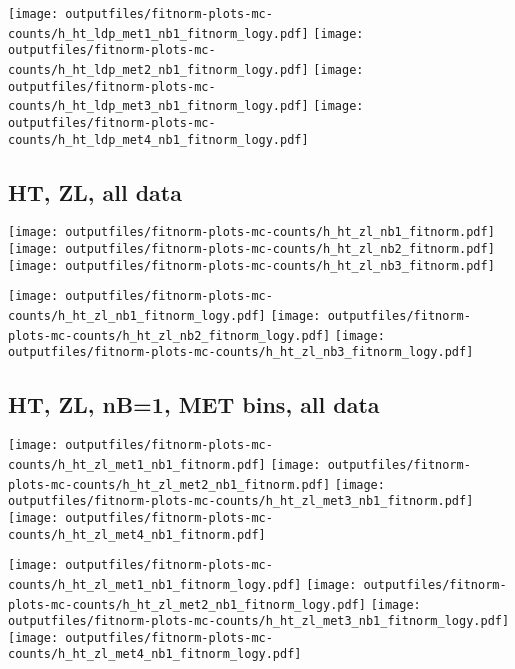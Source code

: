\documentclass[11pt]{article}
\begin{document}
    \noindent
     \texttt{[image: outputfiles/fitnorm-plots-mc-counts/h\_ht\_ldp\_met1\_nb1\_fitnorm\_logy.pdf]}
     \texttt{[image: outputfiles/fitnorm-plots-mc-counts/h\_ht\_ldp\_met2\_nb1\_fitnorm\_logy.pdf]}
     \texttt{[image: outputfiles/fitnorm-plots-mc-counts/h\_ht\_ldp\_met3\_nb1\_fitnorm\_logy.pdf]}
     \texttt{[image: outputfiles/fitnorm-plots-mc-counts/h\_ht\_ldp\_met4\_nb1\_fitnorm\_logy.pdf]}

   \clearpage

     \subsection{ HT, ZL, all data}

    \noindent
     \texttt{[image: outputfiles/fitnorm-plots-mc-counts/h\_ht\_zl\_nb1\_fitnorm.pdf]}
     \texttt{[image: outputfiles/fitnorm-plots-mc-counts/h\_ht\_zl\_nb2\_fitnorm.pdf]}
     \texttt{[image: outputfiles/fitnorm-plots-mc-counts/h\_ht\_zl\_nb3\_fitnorm.pdf]}

    \noindent
     \texttt{[image: outputfiles/fitnorm-plots-mc-counts/h\_ht\_zl\_nb1\_fitnorm\_logy.pdf]}
     \texttt{[image: outputfiles/fitnorm-plots-mc-counts/h\_ht\_zl\_nb2\_fitnorm\_logy.pdf]}
     \texttt{[image: outputfiles/fitnorm-plots-mc-counts/h\_ht\_zl\_nb3\_fitnorm\_logy.pdf]}


   \clearpage

     \subsection{ HT, ZL, nB=1, MET bins, all data}

    \noindent
     \texttt{[image: outputfiles/fitnorm-plots-mc-counts/h\_ht\_zl\_met1\_nb1\_fitnorm.pdf]}
     \texttt{[image: outputfiles/fitnorm-plots-mc-counts/h\_ht\_zl\_met2\_nb1\_fitnorm.pdf]}
     \texttt{[image: outputfiles/fitnorm-plots-mc-counts/h\_ht\_zl\_met3\_nb1\_fitnorm.pdf]}
     \texttt{[image: outputfiles/fitnorm-plots-mc-counts/h\_ht\_zl\_met4\_nb1\_fitnorm.pdf]}

    \noindent
     \texttt{[image: outputfiles/fitnorm-plots-mc-counts/h\_ht\_zl\_met1\_nb1\_fitnorm\_logy.pdf]}
     \texttt{[image: outputfiles/fitnorm-plots-mc-counts/h\_ht\_zl\_met2\_nb1\_fitnorm\_logy.pdf]}
     \texttt{[image: outputfiles/fitnorm-plots-mc-counts/h\_ht\_zl\_met3\_nb1\_fitnorm\_logy.pdf]}
     \texttt{[image: outputfiles/fitnorm-plots-mc-counts/h\_ht\_zl\_met4\_nb1\_fitnorm\_logy.pdf]}
\end{document}
